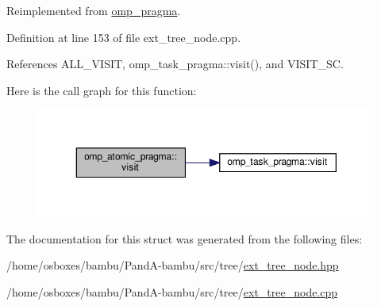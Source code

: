Reimplemented from \hyperlink{structomp__pragma_a2e2c445528b7e097ae76fa618a9970b5}{omp\+\_\+pragma}.



Definition at line 153 of file ext\+\_\+tree\+\_\+node.\+cpp.



References A\+L\+L\+\_\+\+V\+I\+S\+IT, omp\+\_\+task\+\_\+pragma\+::visit(), and V\+I\+S\+I\+T\+\_\+\+SC.

Here is the call graph for this function\+:
\nopagebreak
\begin{figure}[H]
\begin{center}
\leavevmode
\includegraphics[width=350pt]{dc/d12/structomp__atomic__pragma_adf901941aa33c47235e3b20d17410f63_cgraph}
\end{center}
\end{figure}


The documentation for this struct was generated from the following files\+:\begin{DoxyCompactItemize}
\item 
/home/osboxes/bambu/\+Pand\+A-\/bambu/src/tree/\hyperlink{ext__tree__node_8hpp}{ext\+\_\+tree\+\_\+node.\+hpp}\item 
/home/osboxes/bambu/\+Pand\+A-\/bambu/src/tree/\hyperlink{ext__tree__node_8cpp}{ext\+\_\+tree\+\_\+node.\+cpp}\end{DoxyCompactItemize}
